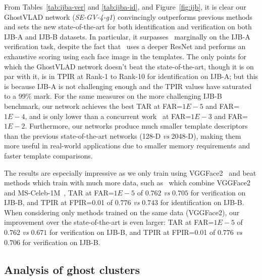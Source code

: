 \documentclass[runningheads]{llncs}
\newcommand{\vs}{\emph{vs }}
\begin{document}
From Tables~\ref{tab:ijba-ver} and \ref{tab:ijba-id},
and Figure~\ref{fig:ijb},
it is clear our GhostVLAD network (\emph{SE-GV-4-g1})
convincingly outperforms previous methods and sets
the new state-of-the-art for both identification and
verification on both IJB-A and IJB-B datasets.
In particular, it surpasses~\cite{Zheng18} marginally
on the IJB-A verification task,  
despite the fact that~\cite{Zheng18}
uses a deeper ResNet and performs an exhaustive
scoring using each face image in the templates.
The only points for which the GhostVLAD network 
doesn't beat the state-of-the-art, 
though it is on par with it, 
is in TPIR at Rank-1 to Rank-10
for identification on IJB-A;  but this is because
IJB-A is not challenging enough and the TPIR values have
saturated to a 99\% mark.
For the same measures on the more challenging IJB-B benchmark, 
our network achieves the best TAR at FAR=$1E-5$ and FAR=$1E-4$,
and is only lower than a concurrent work~\cite{Xie18a} at FAR=$1E-3$ and FAR=$1E-2$.
%
%
%
Furthermore, our networks produce much 
smaller template descriptors than the previous state-of-the-art 
networks (128-D \vs 2048-D),
making them more useful 
in real-world applications due to smaller memory requirements
and faster template comparisons.


The results are especially impressive as we only train
using VGGFace2~\cite{Cao18} and beat methods which train with much more
data, such as~\cite{Cao18}
which combine VGGFace2 and MS-Celeb-1M~\cite{Guo16},
\eg TAR at FAR=$1E-5$ of $0.762$ \vs $0.705$ for verification on IJB-B,
and TPIR at FPIR=0.01 of $0.776$ \vs $0.743$ for identification on IJB-B.
When considering only methods trained on the same data (VGGFace2),
our improvement over the state-of-the-art is even larger:
TAR at FAR=$1E-5$ of $0.762$ \vs $0.671$ for verification on IJB-B,
and TPIR at FPIR=0.01 of $0.776$ \vs $0.706$ for verification on IJB-B.







%
\subsection{Analysis of ghost clusters} \label{sec:visualize_ghost}
%
\end{document}
